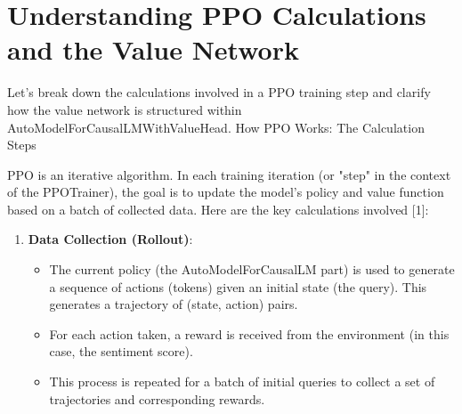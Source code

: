 \documentclass[10pt,a4paper]{report}
\author{Opemipo Adegbemi}
\begin{document}
\section{Understanding PPO Calculations and the Value Network}

Let's break down the calculations involved in a PPO training step and clarify how the value network is structured within AutoModelForCausalLMWithValueHead.
How PPO Works: The Calculation Steps

PPO is an iterative algorithm. In each training iteration (or "step" in the context of the PPOTrainer), the goal is to update the model's policy and value function based on a batch of collected data. Here are the key calculations involved [1]:
\begin{enumerate}
\item    \textbf{Data Collection (Rollout)}:
\begin{itemize}
\item         The current policy (the AutoModelForCausalLM part) is used to generate a sequence of actions (tokens) given an initial state (the query). This generates a trajectory of (state, action) pairs.
\item        For each action taken, a reward is received from the environment (in this case, the sentiment score).
\item         This process is repeated for a batch of initial queries to collect a set of trajectories and corresponding rewards.
\end{itemize}


\end{enumerate}
\end{document}
